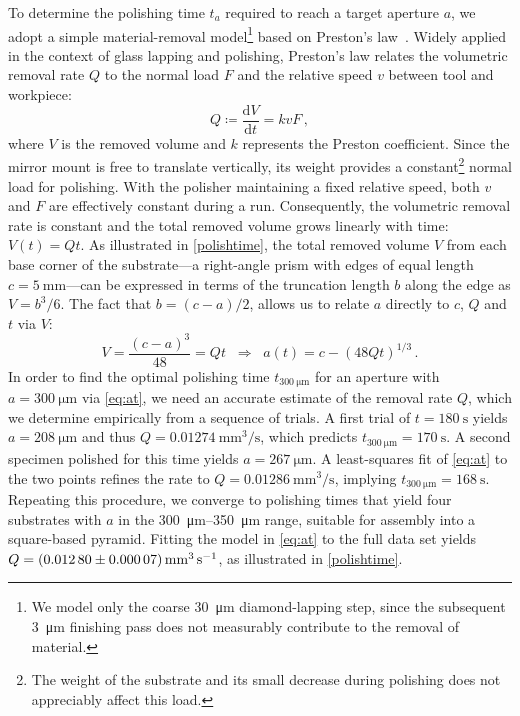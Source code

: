 \documentclass[../Thesis-IJspeert.tex]{subfiles}
\begin{document}
To determine the polishing time $t_a$ required to reach a target aperture $a$, we adopt a simple material-removal model\footnote{We model only the coarse \SI{30}{\micro\metre} diamond-lapping step, since the subsequent \SI{3}{\micro\metre} finishing pass does not measurably contribute to the removal of material.} based on Preston's law~\cite{Preston1927}. Widely applied in the context of glass lapping and polishing, Preston's law relates the volumetric removal rate $Q$ to the normal load $F$ and the relative speed $v$ between tool and workpiece:
\begin{equation}
Q \coloneqq \frac{\mathrm{d}V}{\mathrm{d}t} = k v F\,,
\label{eq:preston-vol}
\end{equation}
where $V$ is the removed volume and $k$ represents the Preston coefficient. Since the mirror mount is free to translate vertically, its weight provides a constant\footnote{The weight of the substrate and its small decrease during polishing does not appreciably affect this load.} normal load for polishing. With the polisher maintaining a fixed relative speed, both $v$ and $F$ are effectively constant during a run. Consequently, the volumetric removal rate is constant and the total removed volume grows linearly with time: $V(t)=Qt$. As illustrated in \autoref{polishtime}, the total removed volume $V$ from each base corner of the substrate---a right-angle prism with edges of equal length $c=\SI{5}{\milli\meter}$---can be expressed in terms of the truncation length $b$ along the edge as $V={b^{3}}/{6}$. The fact that $b = (c-a)/2$, allows us to relate $a$ directly to $c$, $Q$ and $t$ via $V$:
\begin{equation}
V=\frac{(c-a)^3}{48}=Qt
\;\;\Longrightarrow\;\;
a(t)=c-\left( 48Qt \right)^{1/3}\,.
\label{eq:at}
\end{equation}
In order to find the optimal polishing time $t_{\SI{300}{\micro\meter}}$ for an aperture with $a=\SI{300}{\micro\meter}$ via \autoref{eq:at}, we need an accurate estimate of the removal rate $Q$, which we determine empirically from a sequence of trials. A first trial of $t=\SI{180}{\second}$ yields $a=\SI{208}{\micro\metre}$ and thus $Q= \SI{0.01274}{\milli\metre\cubed\per\second}$, which predicts $t_{\SI{300}{\micro\meter}}=\SI{170}{\second}$. A second specimen polished for this time yields $a=\SI{267}{\micro\metre}$. A least-squares fit of \autoref{eq:at} to the two points refines the rate to $Q= \SI{0.01286}{\milli\metre\cubed\per\second}$, implying $t_{\SI{300}{\micro\meter}}=\SI{168}{\second}$. Repeating this procedure, we converge to polishing times that yield four substrates with $a$ in the \SIrange{300}{350}{\micro\metre} range, suitable for assembly into a square-based pyramid. Fitting the model in \autoref{eq:at} to the full data set yields $Q=\SI{0.01280 \pm 0.00007}{\cubic\milli\metre\per\second}$, as illustrated in \autoref{polishtime}.
\end{document}
